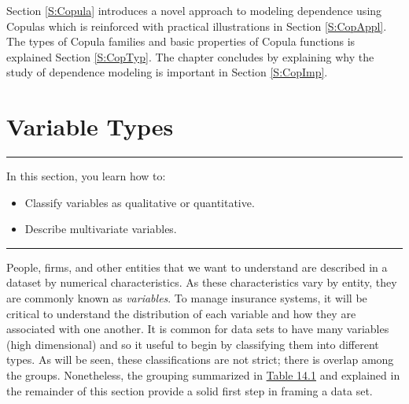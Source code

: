 \documentclass[]{book}
\providecommand{\tightlist}{%
  \setlength{\itemsep}{0pt}\setlength{\parskip}{0pt}}
\theoremstyle{definition}
\theoremstyle{definition}
\theoremstyle{definition}
\theoremstyle{remark}
\begin{document}
Section \ref{S:Copula} introduces a novel approach to modeling
dependence using Copulas which is reinforced with practical
illustrations in Section \ref{S:CopAppl}. The types of Copula families
and basic properties of Copula functions is explained Section
\ref{S:CopTyp}. The chapter concludes by explaining why the study of
dependence modeling is important in Section \ref{S:CopImp}.

\section{Variable Types}\label{S:VarTypes}

\begin{center}\rule{0.5\linewidth}{\linethickness}\end{center}

In this section, you learn how to:

\begin{itemize}
\tightlist
\item
  Classify variables as qualitative or quantitative.
\item
  Describe multivariate variables.
\end{itemize}

\begin{center}\rule{0.5\linewidth}{\linethickness}\end{center}

People, firms, and other entities that we want to understand are
described in a dataset by numerical characteristics. As these
characteristics vary by entity, they are commonly known as
\emph{variables}. To manage insurance systems, it will be critical to
understand the distribution of each variable and how they are associated
with one another. It is common for data sets to have many variables
(high dimensional) and so it useful to begin by classifying them into
different types. As will be seen, these classifications are not strict;
there is overlap among the groups. Nonetheless, the grouping summarized
in \protect\hyperlink{tab:14.1}{Table 14.1} and explained in the
remainder of this section provide a solid first step in framing a data
set.
\end{document}

